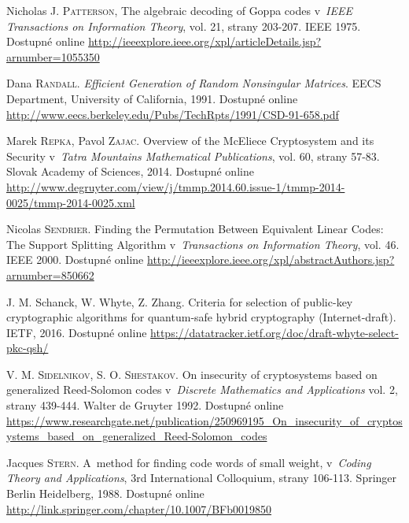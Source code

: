 \documentclass[thesis=M,czech,hidelinks]{FITthesis}[2012/06/26]
\newcommand{\0}{{\textcolor[gray]{0.75}{0}}}
\begin{document}
\begin{thebibliography}{99}

        Nicholas J. \textsc{Patterson}, The algebraic decoding of Goppa codes
        v~\emph{IEEE Transactions on Information Theory}, vol. 21, strany
        203-207. IEEE 1975. Dostupné online
        \url{http://ieeexplore.ieee.org/xpl/articleDetails.jsp?arnumber=1055350}


        Dana \textsc{Randall}. \emph{Efficient Generation of Random Nonsingular
        Matrices}. EECS Department, University of California, 1991. Dostupné
        online
        \url{http://www.eecs.berkeley.edu/Pubs/TechRpts/1991/CSD-91-658.pdf}

        Marek \textsc{Repka}, Pavol \textsc{Zajac}. Overview of the McEliece
        Cryptosystem and its Security v~\emph{Tatra Mountains Mathematical
        Publications}, vol. 60, strany 57-83. Slovak Academy of Sciences, 2014.
        Dostupné online
        \url{http://www.degruyter.com/view/j/tmmp.2014.60.issue-1/tmmp-2014-0025/tmmp-2014-0025.xml}

        Nicolas \textsc{Sendrier}. Finding the Permutation Between Equivalent
        Linear Codes: The Support Splitting Algorithm v~\emph{Transactions on
        Information Theory}, vol. 46. IEEE 2000. Dostupné online
        \url{http://ieeexplore.ieee.org/xpl/abstractAuthors.jsp?arnumber=850662}

        J. M. Schanck, W. Whyte, Z. Zhang. Criteria for selection of public-key
        cryptographic algorithms for quantum-safe hybrid cryptography
        (Internet-draft). IETF, 2016. Dostupné online
        \url{https://datatracker.ietf.org/doc/draft-whyte-select-pkc-qsh/}

        V. M. \textsc{Sidelnikov}, S. O. \textsc{Shestakov}. On insecurity of
        cryptosystems based on generalized Reed-Solomon codes v~\emph{Discrete
        Mathematics and Applications} vol. 2, strany 439-444. Walter de Gruyter
        1992. Dostupné online
        \url{https://www.researchgate.net/publication/250969195\_On\_insecurity\_of\_cryptosystems\_based\_on\_generalized\_Reed-Solomon\_codes}

        Jacques \textsc{Stern}. A~method for finding code words of small weight,
        v~\emph{Coding Theory and Applications}, 3rd International Colloquium,
        strany 106-113. Springer Berlin Heidelberg, 1988. Dostupné online
        \url{http://link.springer.com/chapter/10.1007/BFb0019850}


\end{thebibliography}
\end{document}
